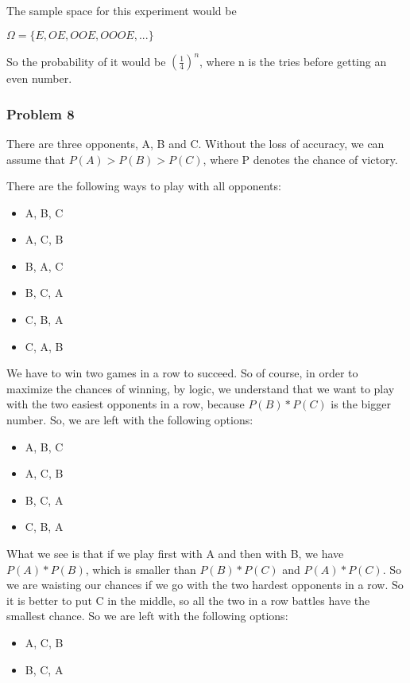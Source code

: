 \documentclass{article}
\begin{document}
The sample space for this experiment would be 


$\Omega = \{E, OE, OOE, OOOE, ...\}$

So the probability of it would be $(\frac{1}{4})^{n}$, where n is the tries before getting an even number.

\subsubsection*{Problem 8}

There are three opponents, A, B and C. Without the loss of accuracy, we can assume that $P(A) > P(B) > P(C)$, where P denotes the chance of victory.

There are the following ways to play with all opponents:

\begin{itemize}
    \item A, B, C
    \item A, C, B
    \item B, A, C
    \item B, C, A
    \item C, B, A
    \item C, A, B
\end{itemize}

We have to win two games in a row to succeed. So of course, in order to maximize the chances of winning, by logic, we understand that we want to play with the two easiest opponents in a row, because $P(B)*P(C)$ is the bigger number. So, we are left with the following options:

\begin{itemize}
    \item A, B, C
    \item A, C, B
    \item B, C, A
    \item C, B, A
\end{itemize}

What we see is that if we play first with A and then with B, we have $P(A)*P(B)$, which is smaller than $P(B)*P(C)$ and $P(A)*P(C)$. So we are waisting our chances if we go with the two hardest opponents in a row. So it is better to put C in the middle, so all the two in a row battles have the smallest chance. So we are left with the following options:


\begin{itemize}
    \item A, C, B
    \item B, C, A
\end{itemize}
\end{document}
